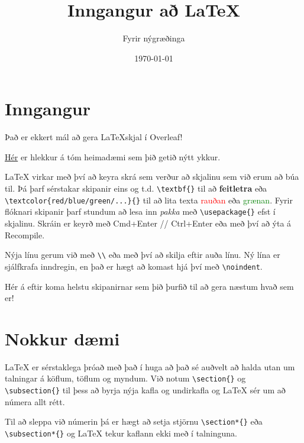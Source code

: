 \documentclass[a4paper, 12pt]{article}
\author{Fyrir nýgræðinga} %
\title{Inngangur að \LaTeX }
\date{\today} %
\begin{document}
 
\maketitle %
\section{Inngangur}
Það er ekkert mál að gera \LaTeX{}skjal í Overleaf! 

\href{https://www.overleaf.com/read/dcbdzkztqyqj}{Hér} er hlekkur á tóm heimadæmi sem þið getið nýtt ykkur. 

\LaTeX{} virkar með því að keyra skrá sem verður að skjalinu sem við erum að búa til. Þá þarf sérstakar skipanir eins og t.d. \verb|\textbf{}| til að \textbf{feitletra} eða \verb|\textcolor{red/blue/green/...}{}| til að lita texta \textcolor{red}{rauðan} eða \textcolor{green}{grænan}. Fyrir flóknari skipanir þarf stundum að lesa inn \textit{pakka} með \verb|\usepackage{}| efst í skjalinu. Skráin er keyrð með Cmd+Enter // Ctrl+Enter eða með því að ýta á Recompile.

Nýja línu gerum við með \verb|\\| eða með því að skilja eftir auða línu. Ný lína er sjálfkrafa inndregin, en það er hægt að komast hjá því með \verb|\noindent|.

\noindent Hér á eftir koma helstu skipanirnar sem þið þurfið til að gera næstum hvað sem er!

\section{Nokkur dæmi}
\LaTeX{} er sérstaklega þróað með það í huga að það sé auðvelt að halda utan um talningar á köflum, töflum og myndum. Við notum \verb|\section{}| og \verb|\subsection{}| til þess að byrja nýja kafla og undirkafla og \LaTeX{} sér um að númera allt rétt. 

Til að sleppa við númerin þá er hægt að setja stjörnu \verb|\section*{}| eða \verb|\subsection*{}| og \LaTeX{} tekur kaflann ekki með í talninguna. 
\end{document}
